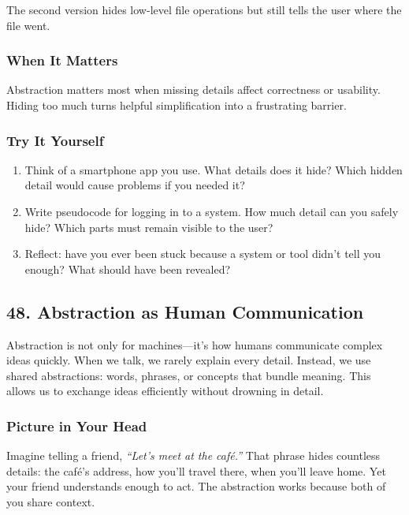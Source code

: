 \documentclass[
  letterpaper,
  DIV=11,
  numbers=noendperiod]{scrreprt}
\providecommand{\tightlist}{%
  \setlength{\itemsep}{0pt}\setlength{\parskip}{0pt}}
\begin{document}
The second version hides low-level file operations but still tells the
user where the file went.

\subsubsection{When It Matters}\label{when-it-matters-44}

Abstraction matters most when missing details affect correctness or
usability. Hiding too much turns helpful simplification into a
frustrating barrier.

\subsubsection{Try It Yourself}\label{try-it-yourself-46}

\begin{enumerate}
\def\labelenumi{\arabic{enumi}.}
\tightlist
\item
  Think of a smartphone app you use. What details does it hide? Which
  hidden detail would cause problems if you needed it?
\item
  Write pseudocode for logging in to a system. How much detail can you
  safely hide? Which parts must remain visible to the user?
\item
  Reflect: have you ever been stuck because a system or tool didn't tell
  you enough? What should have been revealed?
\end{enumerate}

\subsection{48. Abstraction as Human
Communication}\label{abstraction-as-human-communication}

Abstraction is not only for machines---it's how humans communicate
complex ideas quickly. When we talk, we rarely explain every detail.
Instead, we use shared abstractions: words, phrases, or concepts that
bundle meaning. This allows us to exchange ideas efficiently without
drowning in detail.

\subsubsection{Picture in Your Head}\label{picture-in-your-head-47}

Imagine telling a friend, \emph{``Let's meet at the café.''} That phrase
hides countless details: the café's address, how you'll travel there,
when you'll leave home. Yet your friend understands enough to act. The
abstraction works because both of you share context.
\end{document}
